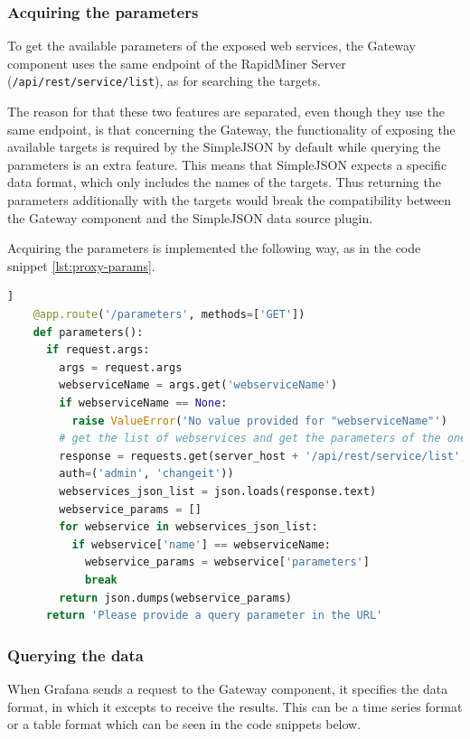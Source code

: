 \subsubsection{Acquiring the parameters}

To get the available parameters of the exposed web services, the Gateway component uses the same endpoint of the RapidMiner Server (\texttt{/api/rest/service/list}), as for searching the targets.

The reason for that these two features are separated, even though they use the same endpoint, is that concerning the Gateway, the functionality of exposing the available targets is required by the SimpleJSON by default while querying the parameters is an extra feature. This means that SimpleJSON expects a specific data format, which only includes the names of the targets. Thus returning the parameters additionally with the targets would break the compatibility between the Gateway component and the SimpleJSON data source plugin.

Acquiring the parameters is implemented the following way, as in the code snippet \ref{lst:proxy-params}.

\begin{minipage}{\linewidth}
	\begin{lstlisting}[language=Python, caption={Get the parameters for a given web service}, label={lst:proxy-params}]]
	@app.route('/parameters', methods=['GET'])
	def parameters():
	  if request.args:
	    args = request.args
	    webserviceName = args.get('webserviceName')
	    if webserviceName == None:
	      raise ValueError('No value provided for "webserviceName"')
	    # get the list of webservices and get the parameters of the one with the name provided in the query
	    response = requests.get(server_host + '/api/rest/service/list',
	    auth=('admin', 'changeit'))
	    webservices_json_list = json.loads(response.text)
	    webservice_params = []
	    for webservice in webservices_json_list:
	      if webservice['name'] == webserviceName:
	        webservice_params = webservice['parameters']
	        break
	    return json.dumps(webservice_params)
	  return 'Please provide a query parameter in the URL'
	\end{lstlisting}
\end{minipage}

\subsubsection{Querying the data}
When Grafana sends a request to the Gateway component, it specifies the data format, in which it excepts to receive the results. This can be a time series format or a table format which can be seen in the code snippets below.


